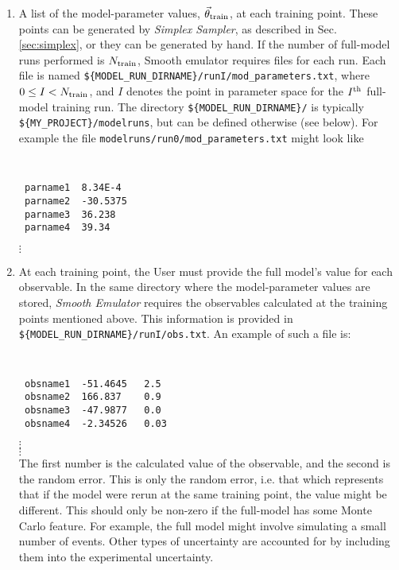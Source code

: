 \documentclass[UserManual.tex]{subfiles}
\begin{document}
\begin{enumerate}
\item A list of the model-parameter values, $\vec{\theta}_{\rm train}$, at each training point. These points can be generated by {\it Simplex Sampler}, as described in Sec. \ref{sec:simplex}, or they can be generated by hand. If the number of full-model runs performed is $N_{\rm train}$, Smooth emulator requires files for each run. Each file is named {\tt \$\{MODEL\_RUN\_DIRNAME\}/runI/mod\_parameters.txt}, where $0\le I<N_{\rm train}$, and $I$ denotes the point in  parameter space for the $I^{\rm th}$ full-model training run. The directory {\tt \$\{MODEL\_RUN\_DIRNAME\}/} is typically {\tt \$\{MY\_PROJECT\}/modelruns}, but can be defined otherwise (see below). For example the file {\tt modelruns/run0/mod\_parameters.txt} might look like
{\tt
\begin{verbatim}
 parname1  8.34E-4
 parname2  -30.5375
 parname3  36.238
 parname4  39.34
\end{verbatim}}
\vspace*{-16pt}
 \hspace*{28pt}$\vdots$\\

\item At each training point, the User must provide the full model's value for each observable. In the same directory where the model-parameter values are stored, {\it Smooth Emulator} requires the observables calculated at the training points mentioned above. This information is provided in {\tt \$\{MODEL\_RUN\_DIRNAME\}/runI/obs.txt}. An example of such a file is:
{\tt
\begin{verbatim}
 obsname1  -51.4645   2.5
 obsname2  166.837    0.9
 obsname3  -47.9877   0.0
 obsname4  -2.34526   0.03
\end{verbatim}}
\vspace*{-16pt}
 \hspace*{28pt}$\vdots$\\
 \vspace*{-16pt}
 \hspace*{28pt}$\vdots$\\
The first number is the calculated value of the observable, and the second is the random error. This is only the random error, i.e. that which represents that if the model were rerun at the same training point, the value might be different. This should only be non-zero if the full-model has some Monte Carlo feature. For example, the full model might involve simulating a small number of events. Other types of uncertainty are accounted for by including them into the experimental uncertainty.


\end{enumerate}
\end{document}
